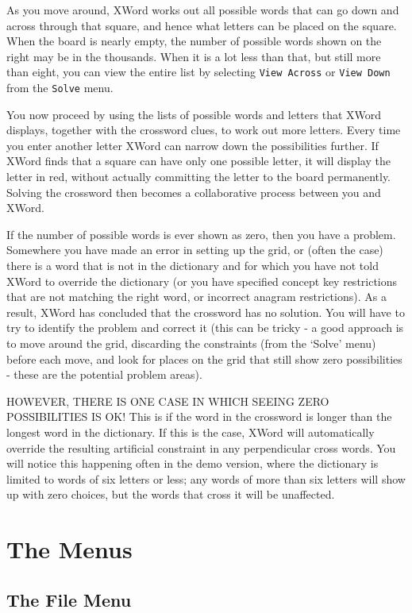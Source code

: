 As you move around, XWord works out all possible
words that can go down and across through that square, and hence
what letters can be placed on the square. When the board is nearly
empty, the number of possible words shown on the right may be in
the thousands. When it is a lot less than that, but still more than
eight, you can view the entire list by selecting {\tt View Across} or
{\tt View Down} from the {\tt Solve} menu.

You now proceed by using the lists of possible words and letters that
XWord displays, together with the crossword clues, to work out
more letters. Every time you enter another letter XWord can
narrow down the possibilities further. If XWord finds that a
square can have only one possible letter, it will display the letter 
in red, without actually committing the letter to the board permanently.
Solving the crossword then becomes a collaborative process between 
you and XWord. 

If the number of possible words is ever shown as zero, then you have
a problem. Somewhere you have made an error in setting up the grid,
or (often the case) there is a word that is not in the dictionary
and for which you have not told XWord to override the
dictionary (or you have specified concept key restrictions that are
not matching the right word, or incorrect anagram restrictions).
As a result, XWord has concluded that the crossword has no solution. 
You will have to try to identify the problem and correct it (this can
be tricky - a good approach is to move around the grid, discarding the
constraints (from the `Solve' menu) before each move, and look for
places on the grid that still show zero possibilities - these are
the potential problem areas).

HOWEVER, THERE IS ONE CASE IN WHICH SEEING ZERO POSSIBILITIES IS OK!
This is if the word in the crossword
is longer than the longest word in the dictionary. If this is the case,
XWord will automatically override the resulting artificial constraint 
in any perpendicular cross words. You will notice this happening often
in the demo version, where the dictionary is limited to words of six
letters or less; any words of more than six letters will show up with
zero choices, but the words that cross it will be unaffected.

\section{The Menus}

\subsection{The File Menu}


